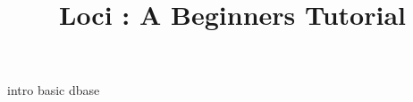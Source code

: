 \documentclass[10pt,epsf]{book}
\title { Loci : A Beginners Tutorial }
\begin{document}
\tableofcontents
\listoffigures
\maketitle
{\small
 {intro}
 {basic}
 {dbase}
}
\end{document}
